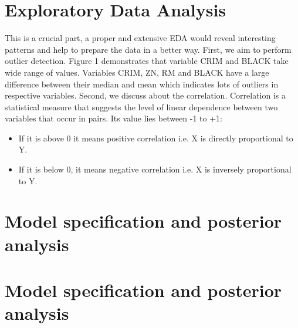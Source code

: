 \documentclass[a4paper,12pt]{article}
\begin{document}
\section{Exploratory Data Analysis}
This is a crucial part, a proper and extensive EDA would reveal interesting patterns and help to prepare the data in a better way. First, we aim to perform outlier detection. Figure 1 demonstrates that variable CRIM and BLACK
take wide range of values. Variables CRIM, ZN, RM and BLACK have a large difference between
their median and mean which indicates lots of outliers in respective variables.
Second, we discuss about the correlation. Correlation is a statistical measure that suggests the
level of linear dependence between two variables that occur in pairs. Its value lies between -1 to +1:
\begin{itemize}
    \item If it is above 0 it means positive correlation i.e. X is directly proportional to Y.
    \item If it is below 0, it means negative correlation i.e. X is inversely proportional to Y.
\end{itemize}

\section{Model specification and posterior analysis}
\section{Model specification and posterior analysis}

\vspace{1cm}

\listoffigures
\end{document}
